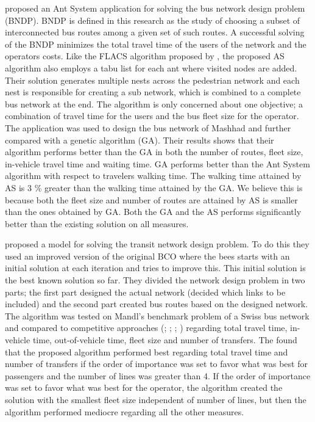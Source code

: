 \citet{poorzahedy11} proposed an Ant System application for solving the bus network design problem (BNDP). BNDP is defined in this research as the study of choosing a subset of interconnected bus routes among a given set of such routes. A successful solving of the BNDP minimizes the total travel time of the users of the network and the operators costs. Like the FLACS algorithm proposed by \citet{salehinejad10}, the proposed AS algorithm also employs a tabu list for each ant where visited nodes are added. Their solution generates multiple nests across the pedestrian network and each nest is responsible for creating a sub network, which is combined to a complete bus network at the end. The algorithm is only concerned about one objective; a combination of travel time for the users and the bus fleet size for the operator. The application was used to design the bus network of Mashhad and further compared with a genetic algorithm (GA). Their results shows that their algorithm performs better than the GA in both the number of routes, fleet size, in-vehicle travel time and waiting time. GA performs better than the Ant System algorithm with respect to travelers walking time. The walking time attained by AS is 3 \% greater than the walking time attained by the GA. We believe this is because both the fleet size and number of routes are attained by AS is smaller than the ones obtained by GA. Both the GA and the AS performs significantly better than the existing solution on all measures.  

\citet{nikolic14} proposed a model for solving the transit network design problem. To do this they used an improved version of the original BCO \citep{lucic03} where the bees starts with an initial solution at each iteration and tries to improve this. This initial solution is the best known solution so far. They divided the network design problem in two parts; the first part designed the actual network (decided which links to be included) and the second part created bus routes based on the designed network. The algorithm was tested on Mandl's benchmark problem of a Swiss bus network\citep{mandl80} and compared to competitive approaches (\citet{mandl80}; \citet{shih94}; \citet{baaj95}; \citet{bagloee11}) regarding total travel time, in-vehicle time, out-of-vehicle time, fleet size and number of transfers. The found that the proposed algorithm performed best regarding total travel time and number of transfers if the order of importance was set to favor what was best for passengers and the number of lines was greater than 4. If the order of importance was set to favor what was best for the operator, the algorithm created the solution with the smallest fleet size independent of number of lines, but then the algorithm performed mediocre regarding all the other measures. 

